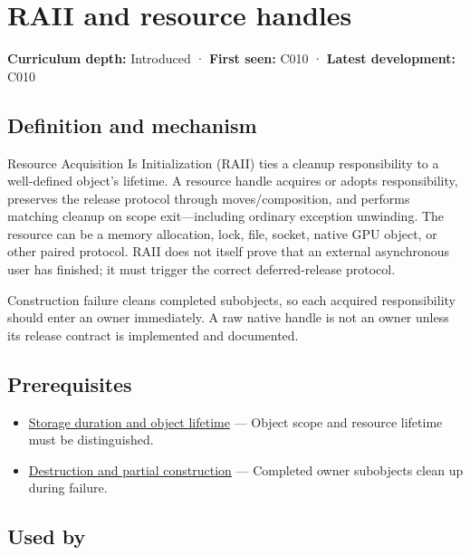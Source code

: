 \hypertarget{appendix-69739d3ab49b}{}\label{referencestart:appendix-69739d3ab49b}
\section{RAII and resource handles}\label{appendix-69739d3ab49b-raii-and-resource-handles}

\textbf{Curriculum depth:} Introduced · \textbf{First seen:} C010 · \textbf{Latest development:} C010

\subsection{Definition and mechanism}\label{appendix-69739d3ab49b-definition-and-mechanism}

Resource Acquisition Is Initialization (RAII) ties a cleanup responsibility to a well-defined object's lifetime. A resource handle acquires or adopts responsibility, preserves the release protocol through moves/composition, and performs matching cleanup on scope exit---including ordinary exception unwinding. The resource can be a memory allocation, lock, file, socket, native GPU object, or other paired protocol. RAII does not itself prove that an external asynchronous user has finished; it must trigger the correct deferred-release protocol.

Construction failure cleans completed subobjects, so each acquired responsibility should enter an owner immediately. A raw native handle is not an owner unless its release contract is implemented and documented.

\subsection{Prerequisites}\label{appendix-69739d3ab49b-prerequisites}

\begin{itemize}
\tightlist
\item
  \hyperref[appendix-0b104bcba06b]{Storage duration and object lifetime} --- Object scope and resource lifetime must be distinguished.
\item
  \hyperref[appendix-9bfe377cef7a]{Destruction and partial construction} --- Completed owner subobjects clean up during failure.
\end{itemize}

\subsection{Used by}\label{appendix-69739d3ab49b-used-by}

